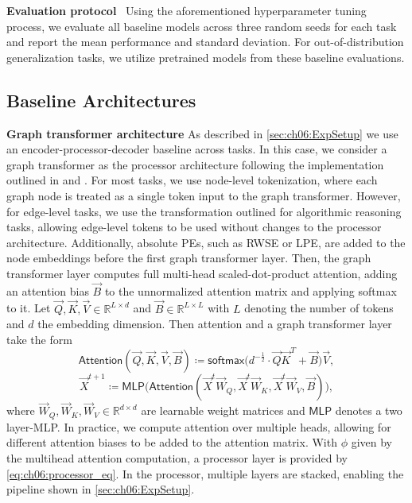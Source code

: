 \textbf{Evaluation protocol}~
Using the aforementioned hyperparameter tuning process, we evaluate all baseline models across three random seeds for each task and report the mean performance and standard deviation. For out-of-distribution generalization tasks, we utilize pretrained models from these baseline evaluations. 

\subsection{Baseline Architectures}
\textbf{Graph transformer architecture}
As described in \cref{sec:ch06:ExpSetup} we use an encoder-processor-decoder baseline across tasks. In this case, we consider a graph transformer as the processor architecture following the implementation outlined in \citet{BecEtAl25} and \citet{StoEtAl25}. 
For most tasks, we use node-level tokenization, where each graph node is treated as a single token input to the graph transformer. However, for edge-level tasks, we use the transformation outlined for algorithmic reasoning tasks, allowing edge-level tokens to be used without changes to the processor architecture. 
Additionally, absolute PEs, such as RWSE or LPE, are added to the node embeddings before the first graph transformer layer. 
Then, the graph transformer layer computes full multi-head scaled-dot-product attention, adding an attention bias $\vec{B}$ to the unnormalized attention matrix and applying softmax to it. Let $\vec{Q}, \vec{K}, \vec{V} \in \mathbb{R}^{L \times d}$ and $\vec{B} \in \mathbb{R}^{L \times L}$ with $L$ denoting the number of tokens and $d$ the embedding dimension. Then attention and a graph transformer layer take the form
\begin{equation*}
\textsf{Attention}(\vec{Q}, \vec{K}, \vec{V}, \vec{B}) \coloneqq \textsf{softmax}\big(d^{-\frac{1}{2}} \cdot \vec{Q}\vec{K}^T + \vec{B} \big) \vec{V},
\end{equation*}
\begin{equation*}
\vec{X}^{t+1} \coloneqq \mathsf{MLP}\big(\textsf{Attention}(\vec{X}^t\vec{W}_Q, \vec{X}^t\vec{W}_K, \vec{X}^t\vec{W}_V, \vec{B})\big),
\end{equation*}
where $\vec{W}_Q, \vec{W}_K, \vec{W}_V \in \mathbb{R}^{d \times d}$ are learnable weight matrices and $\mathsf{MLP}$ denotes a two layer-MLP.  In practice, we compute attention over multiple heads, allowing for different attention biases to be added to the attention matrix. With $\phi$ given by the multihead attention computation, a processor layer is provided by \cref{eq:ch06:processor_eq}. 
In the processor, multiple layers are stacked, enabling the pipeline shown in \cref{sec:ch06:ExpSetup}. 

